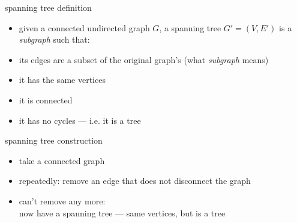 \begin{frame}{spanning tree definition}
\begin{itemize}
    \item given a connected {\small undirected} graph $G$, a spanning tree $G'=(V,E')$ is a \textit{subgraph} such that:
\vspace{.5cm}
\item its edges are a subset of the original graph's (what \textit{subgraph} means)
\item it has the same vertices
\item it is connected
\item it has no cycles --- i.e. it is a tree
\end{itemize}
\end{frame}

\begin{frame}{spanning tree construction}
\begin{itemize}
\item take a connected graph
\item repeatedly: remove an edge that does not disconnect the graph
\item can't remove any more: \\ now have a spanning tree --- same vertices, but is a tree
\end{itemize}
\end{frame}

